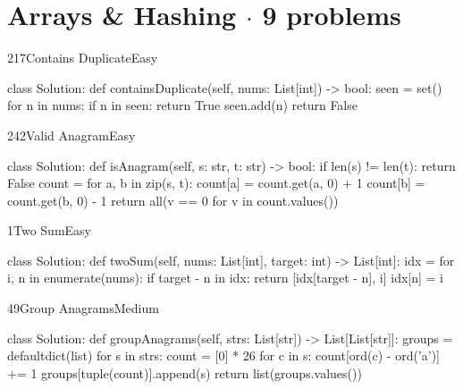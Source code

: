 \section{Arrays \& Hashing \texorpdfstring{{\normalsize\color{muted}$\cdot$ 9 problems}}{- 9 problems}}

\begin{problem}{217}{Contains Duplicate}{Easy}
\begin{code}
class Solution:
    def containsDuplicate(self, nums: List[int]) -> bool:
        seen = set()
        for n in nums:
            if n in seen:
                return True
            seen.add(n)
        return False
\end{code}
\end{problem}

\begin{problem}{242}{Valid Anagram}{Easy}
\begin{code}
class Solution:
    def isAnagram(self, s: str, t: str) -> bool:
        if len(s) != len(t):
            return False
        count = {}
        for a, b in zip(s, t):
            count[a] = count.get(a, 0) + 1
            count[b] = count.get(b, 0) - 1
        return all(v == 0 for v in count.values())
\end{code}
\end{problem}

\begin{problem}{1}{Two Sum}{Easy}
\begin{code}
class Solution:
    def twoSum(self, nums: List[int], target: int) -> List[int]:
        idx = {}
        for i, n in enumerate(nums):
            if target - n in idx:
                return [idx[target - n], i]
            idx[n] = i
\end{code}
\end{problem}

\begin{problem}{49}{Group Anagrams}{Medium}
\begin{code}
class Solution:
    def groupAnagrams(self, strs: List[str]) -> List[List[str]]:
        groups = defaultdict(list)
        for s in strs:
            count = [0] * 26
            for c in s:
                count[ord(c) - ord('a')] += 1
            groups[tuple(count)].append(s)
        return list(groups.values())
\end{code}
\end{problem}

